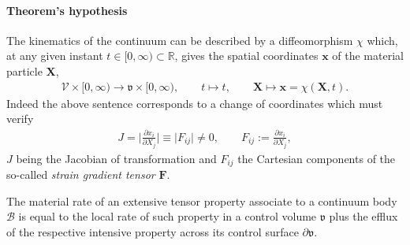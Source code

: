 \paragraph{Theorem's hypothesis}
The kinematics of the continuum can be described by a diffeomorphism
$\chi$ which, at any given instant $t\in [0,\infty)\subset\mathbb{R}$,
  gives the spatial coordinates $\mathbf{x}$ of the material particle
  $\mathbf{X}$,
\begin{align*}
\mathscr{V}\times[0,\infty)\rightarrow \mathfrak{v}\times[0,\infty),
    \qquad t \mapsto t, \qquad
    \mathbf{X}\mapsto\mathbf{x}=\chi(\mathbf{X},t).
\end{align*}
Indeed the above sentence corresponds to a change of coordinates which
must verify
\begin{align*}
J=\bigg\vert\frac{\partial{x}_i}{\partial{X}_j}\bigg\vert\equiv
\big\vert{F_{ij}}\big\vert\neq{0}, \qquad
F_{ij}:=\frac{\partial{x}_i}{\partial{X}_j},
\end{align*}
$J$ being the Jacobian of transformation and $F_{ij}$ the Cartesian
components of the so-called {\em strain gradient tensor} $\mathbf{F}$.

 The material rate of an extensive tensor property
associate to a continuum body $\mathscr{B}$ is equal to the local rate
of such property in a control volume $\mathfrak{v}$ plus the efflux of
the respective intensive property across its control surface
$\partial\mathfrak{v}$.

